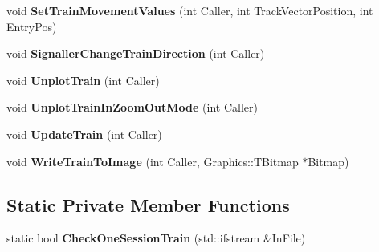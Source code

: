 \begin{DoxyCompactItemize}
void {\bfseries Set\+Train\+Movement\+Values} (int Caller, int Track\+Vector\+Position, int Entry\+Pos)
\item 
\mbox{\label{class_t_train_affbb94aa088370056f8ca8c45a1fdd48}} 
void {\bfseries Signaller\+Change\+Train\+Direction} (int Caller)
\item 
\mbox{\label{class_t_train_a4978a3050ca943076eb6cbd03eeee1d4}} 
void {\bfseries Unplot\+Train} (int Caller)
\item 
\mbox{\label{class_t_train_a439d2809c762a0981908a3b8a49520f2}} 
void {\bfseries Unplot\+Train\+In\+Zoom\+Out\+Mode} (int Caller)
\item 
\mbox{\label{class_t_train_a89ad640ecf8f5163c40727b4e28575fc}} 
void {\bfseries Update\+Train} (int Caller)
\item 
\mbox{\label{class_t_train_a86107a63225b0500b29e049f13545fff}} 
void {\bfseries Write\+Train\+To\+Image} (int Caller, Graphics\+::\+T\+Bitmap $\ast$Bitmap)
\end{DoxyCompactItemize}
\subsection*{Static Private Member Functions}
\begin{DoxyCompactItemize}
\item 
\mbox{\label{class_t_train_aad716bab6f8f4aa6dd49f35130d28dd9}} 
static bool {\bfseries Check\+One\+Session\+Train} (std\+::ifstream \&In\+File)
\end{DoxyCompactItemize}
